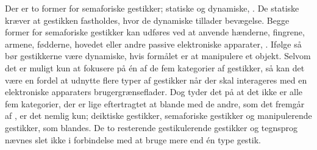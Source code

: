 Der er to former for semaforiske gestikker; statiske og dynamiske, \parencite[s. 7]{PDF:ATaxonomyOfGestures}. De statiske kræver at gestikken fastholdes, hvor de dynamiske tillader bevægelse. Begge former for semaforiske gestikker kan udføres ved at anvende hænderne, fingrene, armene, fødderne, hovedet eller andre passive elektroniske apparater, \parencite[s. 7]{PDF:ATaxonomyOfGestures}. Ifølge \textcite[s. 823]{PDF:UnderstandingNaturalness} så bør gestikkerne være dynamiske, hvis formålet er at manipulere et objekt. \blankline
%
Selvom det er muligt kun at fokusere på én af de fem kategorier af gestikker, så kan det være en fordel at udnytte flere typer af gestikker når der skal interageres med en elektroniske apparaters brugergrænseflader. Dog tyder det på at det ikke er alle fem kategorier, der er lige eftertragtet at blande med de andre, som det fremgår af \textcite[s. 8]{PDF:ATaxonomyOfGestures}, er det nemlig kun; deiktiske gestikker, semaforiske gestikker og manipulerende gestikker, som blandes. De to resterende gestikulerende gestikker og tegnsprog nævnes slet ikke i forbindelse med at bruge mere end én type gestik. 
%
